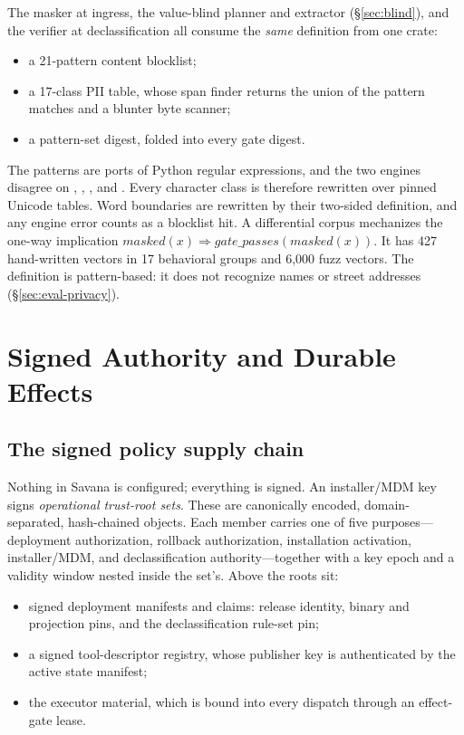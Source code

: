\documentclass[letterpaper,twocolumn,10pt]{article}
\newcommand{\sys}{Savana}
\newcommand{\code}[1]{\texttt{\detokenize{#1}}}
\begin{document}
The masker at ingress, the value-blind planner and extractor
(\S\ref{sec:blind}), and the verifier at declassification all consume the
\emph{same} definition from one crate:
\begin{itemize}
\item a 21-pattern content blocklist;
\item a 17-class PII table, whose span finder returns the union of the
  pattern matches and a blunter byte scanner;
\item a pattern-set digest, folded into every gate digest.
\end{itemize}
The patterns are ports of Python regular expressions, and the two engines
disagree on \code{\b}, \code{\s}, \code{\d}, and \code{\w}. Every character
class is therefore rewritten over pinned Unicode tables. Word boundaries
are rewritten by their two-sided definition, and any engine error counts
as a blocklist hit. A differential corpus mechanizes the one-way
implication
$\mathit{masked}(x)\Rightarrow\mathit{gate\_passes}(\mathit{masked}(x))$.
It has 427 hand-written vectors in 17 behavioral groups and 6{,}000 fuzz
vectors. The definition is pattern-based: it does not recognize names or
street addresses (\S\ref{sec:eval-privacy}).

\section{Signed Authority and Durable Effects}
\label{sec:authority}

\subsection{The signed policy supply chain}
\label{sec:supply}

Nothing in \sys{} is configured; everything is signed. An installer/MDM key
signs \emph{operational trust-root sets}. These are canonically encoded,
domain-separated, hash-chained objects. Each member carries one of five
purposes---deployment authorization, rollback authorization, installation
activation, installer/MDM, and declassification authority---together with
a key epoch and a validity window nested inside the set's. Above the roots
sit:
\begin{itemize}
\item signed deployment manifests and claims: release identity, binary
  and projection pins, and the declassification rule-set pin;
\item a signed tool-descriptor registry, whose publisher key is
  authenticated by the active state manifest;
\item the executor material, which is bound into every dispatch through an
  effect-gate lease.
\end{itemize}
\end{document}
